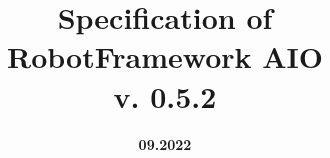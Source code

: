 
\title{\textbf{Specification of \\
\vspace{2ex}
RobotFramework AIO \\
\vspace{2ex}
v. 0.5.2}}

\date{\vspace{4ex}\textbf{09.2022}}

